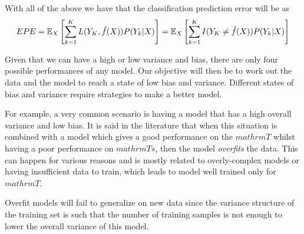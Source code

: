 
With all of the above we have that the classification prediction error will be as
\begin{equation}
EPE = \operatorname{\mathbb{E}}_X\left[ \sum_{k=1}^{K} L( Y_K , \hat{f}(X) ) P(Y_k|X) \right] =
\operatorname{\mathbb{E}}_X\left[ \sum_{k=1}^{K} I(Y _K\neq \hat{f}(X)) P(Y_k|X) \right]
\end{equation}\label{eq:classificationEPE}



Given that we can have a high or low variance and bias, there are only four possible performances of any model. Our objective will then be to work out the data and the model to reach a state of low bias and variance. Different states of bias and variance require strategies to make a better model.

For example, a very common scenario is having a model that has a high overall variance and low bias.
It is said in the literature that when this situation is combined with a model which gives a good performance on the $mathrm{T}$ whilst having a poor performance on $mathrm{Ts}$, then the model \textit{overfits} the data. This can happen for various reasons and is mostly related to overly-complex models or having insufficient data to train, which leads to model well trained only for $mathrm{T}$.

Overfit models will fail to generalize on new data since the variance structure of the training set is such that the number of training samples is not enough to lower the overall variance of this model.





